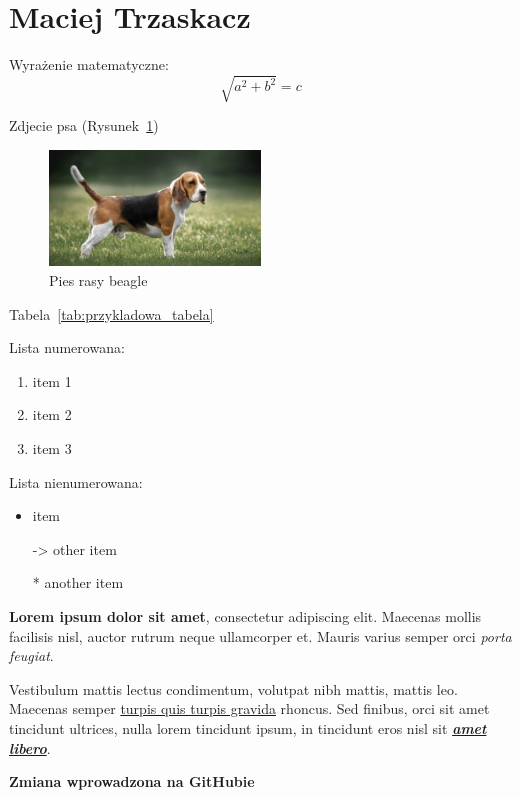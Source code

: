 \section{Maciej Trzaskacz}

Wyrażenie matematyczne: \[\sqrt{a^2+b^2}=c\]


Zdjecie psa (Rysunek~\ref{fig:pies})
\begin{figure}[htbp]
    \centering
    \includegraphics[width=0.5\textwidth]{pictures/pies.jpg}
    \caption{Pies rasy beagle}
    \label{fig:pies}
\end{figure}
    
Tabela~\ref{tab:przykladowa_tabela}


    Lista numerowana:
    \begin{enumerate}
        \item item 1
        \item item 2
        \item item 3
    \end{enumerate}
    
    Lista nienumerowana:
    \begin{itemize}
        \item item
        \item[->] other item
        \item[*] another item
    \end{itemize}

    \textbf{Lorem ipsum dolor sit amet}, consectetur adipiscing elit. Maecenas mollis facilisis nisl, auctor rutrum neque ullamcorper et. Mauris varius semper orci \textit{porta feugiat}.
    
    Vestibulum mattis lectus condimentum, volutpat nibh mattis, mattis leo. Maecenas semper \underline{turpis quis turpis gravida} rhoncus. Sed finibus, orci sit amet tincidunt ultrices, nulla lorem tincidunt ipsum, in tincidunt eros nisl sit \textbf{\textit{\underline{amet libero}}}.
    
    \textbf{Zmiana wprowadzona na GitHubie}
